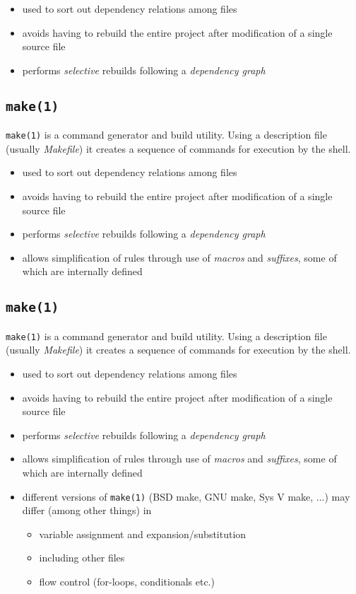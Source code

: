 \documentclass[xga]{xdvislides}
\begin{document}
\begin{itemize}
	\item used to sort out dependency relations among files
	\item avoids having to rebuild the entire project after modification of a
		single source file
	\item performs {\em selective} rebuilds following a {\em dependency graph}
\end{itemize}

\subsection{{\tt make(1)}}
{\tt make(1)} is a command generator and build utility. Using a
description file (usually {\em Makefile}) it creates a sequence of
commands for execution by the shell.

\begin{itemize}
	\item used to sort out dependency relations among files
	\item avoids having to rebuild the entire project after modification of a
		single source file
	\item performs {\em selective} rebuilds following a {\em dependency graph}
	\item allows simplification of rules through use of {\em macros} and {\em
		suffixes}, some of which are internally defined
\end{itemize}

\subsection{{\tt make(1)}}
{\tt make(1)} is a command generator and build utility. Using a
description file (usually {\em Makefile}) it creates a sequence of
commands for execution by the shell.

\begin{itemize}
	\item used to sort out dependency relations among files
	\item avoids having to rebuild the entire project after modification of a
		single source file
	\item performs {\em selective} rebuilds following a {\em dependency graph}
	\item allows simplification of rules through use of {\em macros} and {\em
		suffixes}, some of which are internally defined
	\item different versions of {\tt make(1)} (BSD make, GNU make, Sys V make,
		...) may differ (among other things) in
		\begin{itemize}
			\item variable assignment and expansion/substitution
			\item including other files
			\item flow control (for-loops, conditionals etc.)
		\end{itemize}
\end{itemize}
\end{document}
